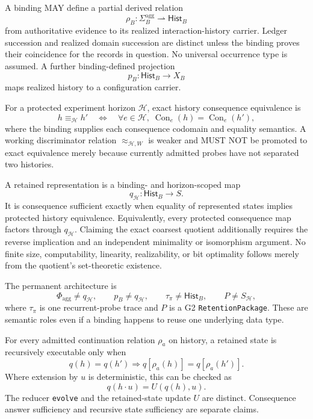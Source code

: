 \documentclass[11pt]{article}
\begin{document}
A binding MAY define a partial derived relation
\[
 \rho_B:\Sigma^{\mathrm{agg}}_B\rightharpoonup\mathsf{Hist}_B
\]
from authoritative evidence to its realized interaction-history carrier. Ledger
succession and realized domain succession are distinct unless the binding proves
their coincidence for the records in question. No universal occurrence type is
assumed. A further binding-defined projection
\[
 p_B:\mathsf{Hist}_B\longrightarrow X_B
\]
maps realized history to a configuration carrier.

For a protected experiment horizon $\mathcal H$, exact history consequence
equivalence is
\[
 h\equiv_{\mathcal H}h'
 \quad\Longleftrightarrow\quad
 \forall e\in\mathcal H,\;
 \operatorname{Con}_e(h)=\operatorname{Con}_e(h'),
\]
where the binding supplies each consequence codomain and equality semantics. A
working discriminator relation $\approx_{\mathcal H,W}$ is weaker and MUST NOT
be promoted to exact equivalence merely because currently admitted probes have
not separated two histories.

A retained representation is a binding- and horizon-scoped map
\[
 q_{\mathcal H}:\mathsf{Hist}_B\longrightarrow S.
\]
It is consequence sufficient exactly when equality of represented states implies
protected history equivalence. Equivalently, every protected consequence map
factors through $q_{\mathcal H}$. Claiming the exact coarsest quotient additionally
requires the reverse implication and an independent minimality or isomorphism
argument. No finite size, computability, linearity, realizability, or bit
optimality follows merely from the quotient's set-theoretic existence.

The permanent architecture is
\[
 \boxed{\Phi_{\mathrm{agg}}\neq q_{\mathcal H}},\qquad
 \boxed{p_B\neq q_{\mathcal H}},\qquad
 \boxed{\tau_\pi\neq\mathsf{Hist}_B},\qquad
 \boxed{P\neq S_{\mathcal H}},
\]
where $\tau_\pi$ is one recurrent-probe trace and $P$ is a G2
\texttt{RetentionPackage}. These are semantic roles even if a binding happens to
reuse one underlying data type.

For every admitted continuation relation $\rho_a$ on history, a retained state is
recursively executable only when
\[
 q(h)=q(h')\Longrightarrow q[\rho_a(h)]=q[\rho_a(h')].
\]
Where extension by $u$ is deterministic, this can be checked as
\[
 q(h\mathbin{\cdot}u)=U(q(h),u).
\]
The reducer \texttt{evolve} and the retained-state update $U$ are distinct.
Consequence answer sufficiency and recursive state sufficiency are separate
claims.
\end{document}
